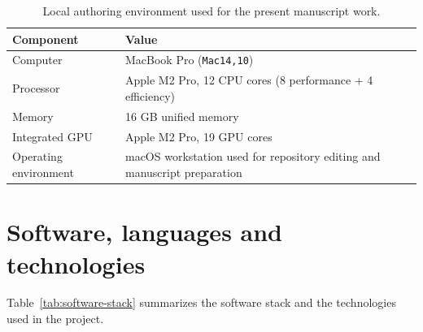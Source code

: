 \documentclass[12pt,a4paper]{report}
\begin{document}
\begin{table}[H]
  \centering
  \small
  \begin{tabularx}{\textwidth}{>{\raggedright\arraybackslash}p{} Y}
    \toprule
    Component & Value \\
    \midrule
    Computer & MacBook Pro (\texttt{Mac14,10}) \\
    Processor & Apple M2 Pro, 12 CPU cores (8 performance + 4 efficiency) \\
    Memory & 16 GB unified memory \\
    Integrated GPU & Apple M2 Pro, 19 GPU cores \\
    Operating environment & macOS workstation used for repository editing and manuscript preparation \\
    \bottomrule
  \end{tabularx}
  \caption{Local authoring environment used for the present manuscript work.}
  \label{tab:local-hardware}
\end{table}

\section{Software, languages and technologies}
Table~\ref{tab:software-stack} summarizes the software stack and the technologies used in the project.
\end{document}
